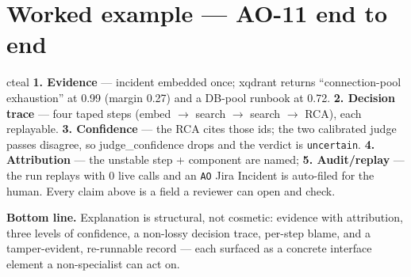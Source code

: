 \documentclass[11pt]{article}
\begin{document}
\section{Worked example --- AO-11 end to end}
\begin{notebox}{cteal}
\textbf{1. Evidence} --- incident embedded once; xqdrant returns ``connection-pool exhaustion''
at 0.99 (margin 0.27) and a DB-pool runbook at 0.72. \textbf{2. Decision trace} --- four taped
steps (embed $\to$ search $\to$ search $\to$ RCA), each replayable. \textbf{3. Confidence} ---
the RCA cites those ids; the two calibrated judge passes disagree, so judge\_confidence drops and
the verdict is \texttt{uncertain}. \textbf{4. Attribution} --- the unstable step + component are
named; \textbf{5. Audit/replay} --- the run replays with 0 live calls and an \texttt{AO} Jira
Incident is auto-filed for the human. Every claim above is a field a reviewer can open and check.
\end{notebox}

\begin{keybox}
\textbf{Bottom line.} Explanation is structural, not cosmetic: evidence with attribution,
three levels of confidence, a non-lossy decision trace, per-step blame, and a tamper-evident,
re-runnable record --- each surfaced as a concrete interface element a non-specialist can act on.
\end{keybox}
\end{document}
